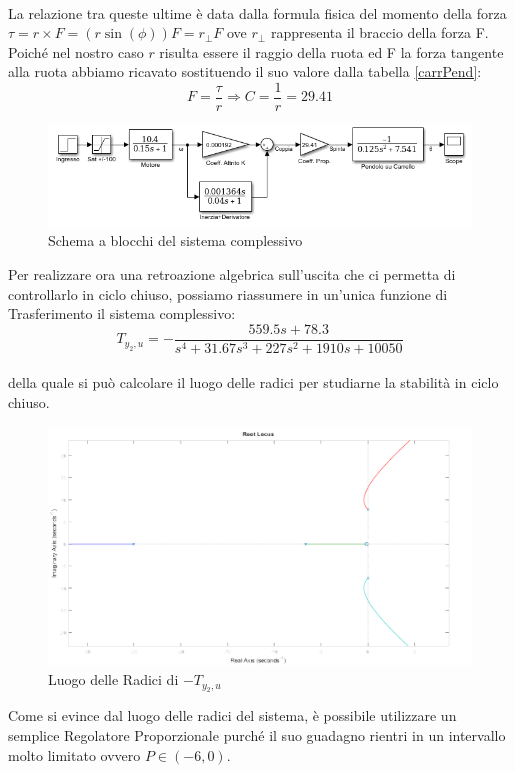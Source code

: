 \\La relazione tra queste ultime è data dalla formula fisica del momento della forza
$\tau=r\times F=(r\sin(\phi))F=r_{\bot}F$
ove $r_{\bot}$ rappresenta il braccio della forza F.
Poiché nel nostro caso $r$ risulta essere il raggio della ruota ed F la forza tangente alla ruota abbiamo ricavato sostituendo il suo valore dalla tabella \ref{carrPend}: $$F=\displaystyle\frac{\tau}{r}\Rightarrow C=\displaystyle\frac{1}{r}=29.41$$ 
\begin{figure}[ht]
	\centering
	\includegraphics[width=\textwidth]{SisComplessivoPendoloNormale.PNG}
	\caption{Schema a blocchi del sistema complessivo}
	\label{SisComplessivoPendoloNormale}
\end{figure}
Per realizzare ora una retroazione algebrica sull'uscita che ci permetta di controllarlo in ciclo chiuso, possiamo riassumere in un'unica funzione di Trasferimento il sistema complessivo:\\
$$T_{y_2,u}=-\displaystyle\frac{559.5s+78.3}{s^4+31.67s^3+227s^2+1910s+10050}$$\\
della quale si può calcolare il luogo delle radici per studiarne la stabilità in ciclo chiuso.
\begin{figure}[ht]
	\centering
	\includegraphics[width=\textwidth]{RLocusPendoloNormale.PNG}
	\caption{Luogo delle Radici di $-T_{y_2,u}$}
	\label{RLocusPendoloNormale}
\end{figure}
Come si evince dal luogo delle radici del sistema, è possibile utilizzare un semplice Regolatore Proporzionale purché il suo guadagno rientri in un intervallo molto limitato ovvero $P\in(-6,0)$.
